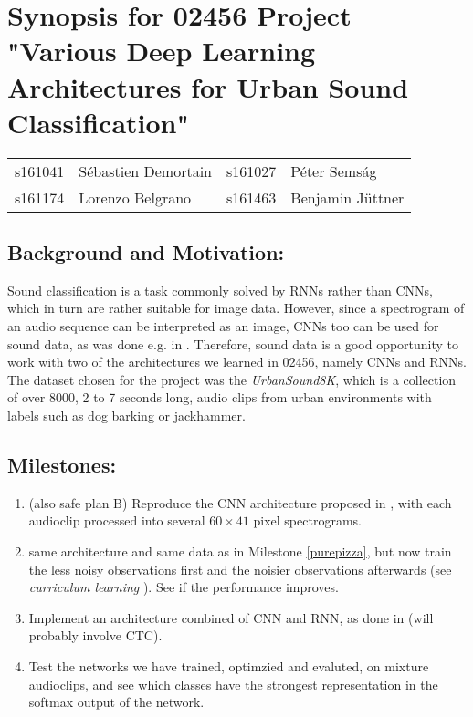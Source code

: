\documentclass[utf-8]{article}
\newcommand{\urb}{\textit{UrbanSound8K}}
\begin{document}
\section*{Synopsis for 02456 Project "Various Deep Learning Architectures for Urban Sound Classification"}
\begin{tabular}{ll|ll}
s161041 &Sébastien Demortain &s161027 &Péter Semság\\
 s161174 &Lorenzo Belgrano &s161463 &Benjamin Jüttner
\end{tabular}

\subsection*{Background and Motivation:}
Sound classification is a task commonly solved by RNNs rather than CNNs, which in turn are rather suitable for image data. However, since a spectrogram of an audio sequence can be interpreted as an image, CNNs too can be used for sound data, as was done e.g. in \cite{pizza}. Therefore, sound data is a good opportunity to work with two of the architectures we learned in 02456, namely CNNs and RNNs. The dataset chosen for the project was the \urb\cite{urban}, which is a collection of over 8000, 2 to 7 seconds long, audio clips from urban environments with labels such as dog barking or jackhammer.  

\subsection*{Milestones:} %
\begin{enumerate}
\item (also safe plan B) Reproduce the CNN architecture proposed in \cite{pizza}, with each audioclip processed into several $60\times41$ pixel spectrograms.\label{purepizza}
\item same architecture and same data as in Milestone \ref{purepizza}, but now train the less noisy observations first and the noisier observations afterwards (see \textit{curriculum learning} \cite{curr}). See if the performance improves.
\item Implement an architecture combined of CNN and RNN, as done in \cite{deepspeech} (will probably involve CTC). %
\item Test the networks we have trained, optimzied and evaluted, on mixture audioclips, and see which classes have the strongest representation in the softmax output of the network. 
\end{enumerate}
\end{document}
